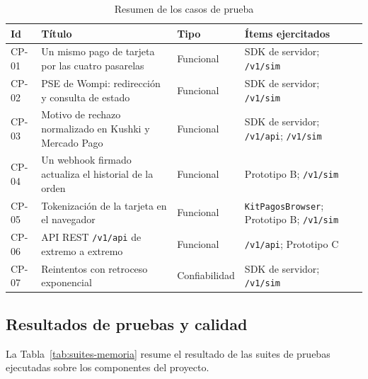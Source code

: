 \begin{table}[H]
  \centering
  \small
  \renewcommand{\arraystretch}{1.2}
  \begin{tabularx}{\textwidth}{|>{\raggedright\arraybackslash}p{1.2cm}|>{\raggedright\arraybackslash}X|>{\raggedright\arraybackslash}p{2.2cm}|>{\raggedright\arraybackslash}p{4.1cm}|}
    \hline
    \textbf{Id} & \textbf{Título} & \textbf{Tipo} & \textbf{Ítems ejercitados} \\ \hline
    CP-01 & Un mismo pago de tarjeta por las cuatro pasarelas & Funcional & SDK de servidor; \texttt{/v1/sim} \\ \hline
    CP-02 & PSE de Wompi: redirección y consulta de estado & Funcional & SDK de servidor; \texttt{/v1/sim} \\ \hline
    CP-03 & Motivo de rechazo normalizado en Kushki y Mercado Pago & Funcional & SDK de servidor; \texttt{/v1/api}; \texttt{/v1/sim} \\ \hline
    CP-04 & Un webhook firmado actualiza el historial de la orden & Funcional & Prototipo B; \texttt{/v1/sim} \\ \hline
    CP-05 & Tokenización de la tarjeta en el navegador & Funcional & \texttt{KitPagosBrowser}; Prototipo B; \texttt{/v1/sim} \\ \hline
    CP-06 & API REST \texttt{/v1/api} de extremo a extremo & Funcional & \texttt{/v1/api}; Prototipo C \\ \hline
    CP-07 & Reintentos con retroceso exponencial & Confiabilidad & SDK de servidor; \texttt{/v1/sim} \\ \hline
  \end{tabularx}
  \caption{Resumen de los casos de prueba}
  \label{tab:casos-memoria}
\end{table}

\subsection{Resultados de pruebas y calidad}
\label{sec:vii-pruebas}

La Tabla~\ref{tab:suites-memoria} resume el resultado de las suites de pruebas ejecutadas sobre los componentes del proyecto.

